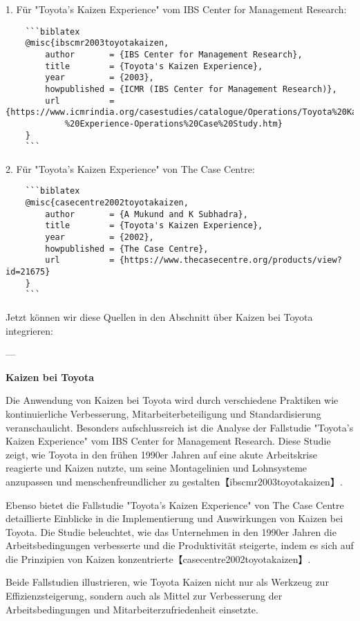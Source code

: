 1. Für "Toyota's Kaizen Experience" vom IBS Center for Management Research:

\begin{verbatim}
	```biblatex
	@misc{ibscmr2003toyotakaizen,
		author       = {IBS Center for Management Research},
		title        = {Toyota's Kaizen Experience},
		year         = {2003},
		howpublished = {ICMR (IBS Center for Management Research)},
		url          = {https://www.icmrindia.org/casestudies/catalogue/Operations/Toyota%20Kaizen
			%20Experience-Operations%20Case%20Study.htm}
	}
	```
\end{verbatim}

2. Für "Toyota's Kaizen Experience" von The Case Centre:

\begin{verbatim}
	```biblatex
	@misc{casecentre2002toyotakaizen,
		author       = {A Mukund and K Subhadra},
		title        = {Toyota's Kaizen Experience},
		year         = {2002},
		howpublished = {The Case Centre},
		url          = {https://www.thecasecentre.org/products/view?id=21675}
	}
	```
\end{verbatim}

Jetzt können wir diese Quellen in den Abschnitt über Kaizen bei Toyota integrieren:

---

\textbf{Kaizen bei Toyota}

Die Anwendung von Kaizen bei Toyota wird durch verschiedene Praktiken wie kontinuierliche Verbesserung, Mitarbeiterbeteiligung und Standardisierung veranschaulicht. Besonders aufschlussreich ist die Analyse der Fallstudie "Toyota's Kaizen Experience" vom IBS Center for Management Research. Diese Studie zeigt, wie Toyota in den frühen 1990er Jahren auf eine akute Arbeitskrise reagierte und Kaizen nutzte, um seine Montagelinien und Lohnsysteme anzupassen und menschenfreundlicher zu gestalten【ibscmr2003toyotakaizen】.

Ebenso bietet die Fallstudie "Toyota's Kaizen Experience" von The Case Centre detaillierte Einblicke in die Implementierung und Auswirkungen von Kaizen bei Toyota. Die Studie beleuchtet, wie das Unternehmen in den 1990er Jahren die Arbeitsbedingungen verbesserte und die Produktivität steigerte, indem es sich auf die Prinzipien von Kaizen konzentrierte【casecentre2002toyotakaizen】.

Beide Fallstudien illustrieren, wie Toyota Kaizen nicht nur als Werkzeug zur Effizienzsteigerung, sondern auch als Mittel zur Verbesserung der Arbeitsbedingungen und Mitarbeiterzufriedenheit einsetzte.

